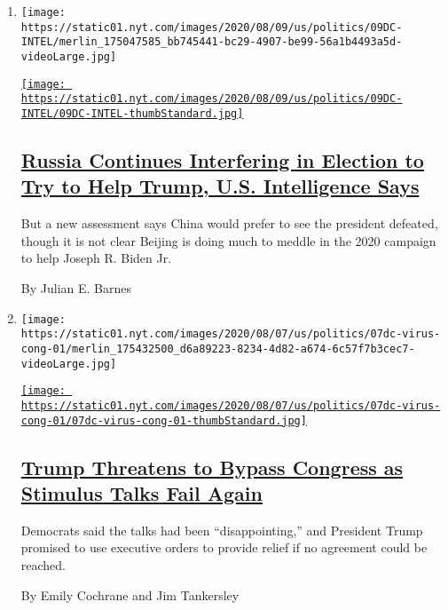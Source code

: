 \begin{enumerate}
\def\labelenumi{\arabic{enumi}.}
\item
  \texttt{[image: https://static01.nyt.com/images/2020/08/09/us/politics/09DC-INTEL/merlin\_175047585\_bb745441-bc29-4907-be99-56a1b4493a5d-videoLarge.jpg]}

  \href{/2020/08/07/us/politics/russia-china-trump-biden-election-interference.html}{\texttt{[image: https://static01.nyt.com/images/2020/08/09/us/politics/09DC-INTEL/09DC-INTEL-thumbStandard.jpg]}}

  \hypertarget{russia-continues-interfering-in-election-to-try-to-help-trump-us-intelligence-says}{%
  \subsection{\texorpdfstring{\href{/2020/08/07/us/politics/russia-china-trump-biden-election-interference.html}{Russia
  Continues Interfering in Election to Try to Help Trump, U.S.
  Intelligence
  Says}}{Russia Continues Interfering in Election to Try to Help Trump, U.S. Intelligence Says}}\label{russia-continues-interfering-in-election-to-try-to-help-trump-us-intelligence-says}}

  But a new assessment says China would prefer to see the president
  defeated, though it is not clear Beijing is doing much to meddle in
  the 2020 campaign to help Joseph R. Biden Jr.

  By Julian E. Barnes
\item
  \texttt{[image: https://static01.nyt.com/images/2020/08/07/us/politics/07dc-virus-cong-01/merlin\_175432500\_d6a89223-8234-4d82-a674-6c57f7b3cec7-videoLarge.jpg]}

  \href{/2020/08/07/us/politics/trump-congress-stimulus.html}{\texttt{[image: https://static01.nyt.com/images/2020/08/07/us/politics/07dc-virus-cong-01/07dc-virus-cong-01-thumbStandard.jpg]}}

  \hypertarget{trump-threatens-to-bypass-congress-as-stimulus-talks-fail-again}{%
  \subsection{\texorpdfstring{\href{/2020/08/07/us/politics/trump-congress-stimulus.html}{Trump
  Threatens to Bypass Congress as Stimulus Talks Fail
  Again}}{Trump Threatens to Bypass Congress as Stimulus Talks Fail Again}}\label{trump-threatens-to-bypass-congress-as-stimulus-talks-fail-again}}

  Democrats said the talks had been ``disappointing,'' and President
  Trump promised to use executive orders to provide relief if no
  agreement could be reached.

  By Emily Cochrane and Jim Tankersley
\end{enumerate}

